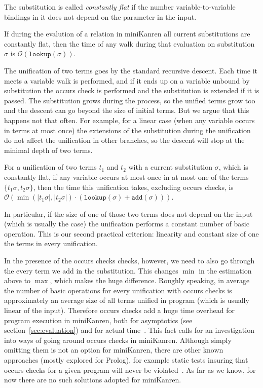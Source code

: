 \documentclass[acmsmall, anonymous, review]{acmart}
\newcommand{\sectionword}{section}
\newcommand{\mK}{miniKanren\xspace}
\newcommand{\lookuptime}[1]{\texttt{lookup}(#1)}
\newcommand{\addtime}[1]{\texttt{add}(#1)}
\renewcommand{\O}{\mathcal{O}}
\begin{document}
\begin{definition}
The substitution is called \emph{constantly flat} if the number variable-to-variable bindings in it does not depend on the parameter in the input.
\end{definition}


\begin{lemma}
If during the evalution of a relation in \mK all current substitutions are constantly flat, then the time of any walk during that evaluation on substitution $\sigma$ is $\O(\lookuptime{\sigma})$.
\end{lemma}

The unification of two terms goes by the standard recursive descent. Each time it meets a variable walk is performed, and if it ends up on a variable unbound by substitution the occurs check is performed and the substitution is extended if it is passed. The substitution grows during the process, so the unified terms grow too and the descent can go beyond the size of initial terms. But we argue that this happens not that often. For example, for a linear case (when any variable occurs in terms at most once) the extensions of the substitution during the unification do not affect the unification in other branches, so the descent will stop at the minimal depth of two terms. 

\begin{lemma}
For a unification of two terms $t_1$ and $t_2$ with a current substitution $\sigma$, which is constantly flat, if any variable occurs at most once in at most one of the terms $\{ t_1 \sigma, t_2 \sigma \}$, then the time this unification takes, excluding occurs checks, is $\O(\min(|t_1 \sigma|, |t_2 \sigma|) \cdot (\lookuptime{\sigma} + \addtime{\sigma}))$.
\end{lemma}

In particular, if the size of one of those two terms does not depend on the input (which is usually the case) the unification performs a constant number of basic operation. This is our second practical criterion: linearity and constant size of one the terms in every unification.

In the presence of the occurs checks checks, however, we need to also go through the every term we add in the substitution. This changes $\min$ in the estimation above to $\max$, which makes the huge difference. Roughly speaking, in average the number of basic operations for every unification with occurs checks is approximately an average size of all terms unified in program (which is usually linear of the input). Therefore occurs checks add a huge time overhead for program execution in \mK, both for asymptotics (see \sectionword~\ref{sec:evaluation}) and for actual time~\cite{WillThesis}. This fact calls for an investigation into ways of going around occurs checks in \mK. Although simply omitting them is not an option for \mK, there are other known approaches (mostly explored for Prolog), for example static tests insuring that occurs checks for a given program will never be violated~\cite{OccursCheckStaticTest}. As far as we know, for now there are no such solutions adopted for \mK.
\end{document}
